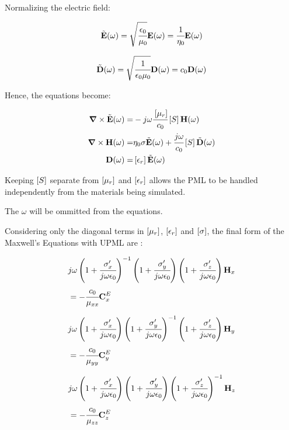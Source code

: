 Normalizing the electric field:

\begin{equation}
    \tilde{\textbf{E}}(\omega) = \sqrt{\cfrac{\epsilon_0}{\mu_0}}\textbf{E}(\omega) = \cfrac{1}{\eta_0}\textbf{E}(\omega)
\end{equation}

\begin{equation}
    \tilde{\textbf{D}}(\omega) = \sqrt{\cfrac{1}{\epsilon_0\mu_0}} \textbf{D}(\omega) = c_0 \textbf{D}(\omega)
\end{equation}

Hence, the equations become:

\begin{eqnarray}
    \rot \Enw (\omega) =& -j\omega\cfrac{\brackets{\mu_r}}{c_0} \brackets{S} \Hh (\omega) \\
    \rot \Hh (\omega) =& \eta_0 \sigma \Enw(\omega) + \cfrac{j\omega}{c_0}\brackets{S} \Dnw (\omega) \\
    \D (\omega) =& \brackets{\epsilon _r} \Enw (\omega)
\end{eqnarray}

Keeping $\brackets{S}$ separate from $\brackets{\mu_r}$ and $\brackets{\epsilon_r}$ allows the PML to be handled independently from the materials being simulated.

The $\omega$ will be ommitted from the equations.

Considering only the diagonal terms in $\brackets{\mu_r}$, $\brackets{\epsilon_r}$ and $\brackets{\sigma}$, the final form of the Maxwell's Equations with UPML are \cite{empossible_3d_pml}:

\begin{eqnarray}
    &j\omega\pare{1 + \cfrac{\sigma_x\Prime}{j\omega\epsilon_0}}\inverse \pare{1 + \cfrac{\sigma_y\Prime}{j\omega\epsilon_0}}\pare{1 + \cfrac{\sigma_z\Prime}{j\omega\epsilon_0}} \Hh_x \nonumber \\
    &= -\cfrac{c_0}{\mu_{xx}}\CExw
    \label{eq:Hx_upml_freq}
\end{eqnarray}

\begin{eqnarray}
    &j\omega\pare{1 + \cfrac{\sigma_x\Prime}{j\omega\epsilon_0}} \pare{1 + \cfrac{\sigma_y\Prime}{j\omega\epsilon_0}}\inverse\pare{1 + \cfrac{\sigma_z\Prime}{j\omega\epsilon_0}} \Hh_y \nonumber \\
    &= -\cfrac{c_0}{\mu_{yy}}\CEyw
    \label{eq:Hy_upml_freq}
\end{eqnarray}

\begin{eqnarray}
    &j\omega\pare{1 + \cfrac{\sigma_x\Prime}{j\omega\epsilon_0}} \pare{1 + \cfrac{\sigma_y\Prime}{j\omega\epsilon_0}}\pare{1 + \cfrac{\sigma_z\Prime}{j\omega\epsilon_0}}\inverse \Hh_z \nonumber \\
    &= -\cfrac{c_0}{\mu_{zz}}\CEzw
    \label{eq:Hz_upml_freq}
\end{eqnarray}

